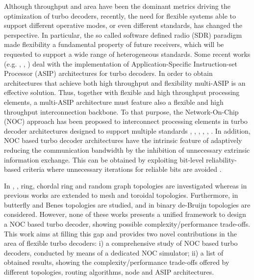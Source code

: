 \documentclass[10pt,twocolumn,journal]{IEEEtran}
\begin{document}
Although throughput and area have been the dominant metrics driving the optimization of turbo decoders,
recently, the need for flexible systems able to support different operative 
modes, or even different standards, has changed the perspective. In particular, the so called software defined radio 
(SDR) paradigm made flexibility a fundamental property \cite{polydoros_PIMRC08} of future receivers, which will be 
requested to support a wide range of heterogeneous standards.
Some recent works  
(e.g.  \cite{wehn_TVLSI08}, \cite{bougard_ICT08}, \cite{baghdadi_TVLSI09}) deal with 
the implementation of Application-Specific Instruction-set 
Processor (ASIP) architectures for turbo decoders. In order to obtain architectures that achieve both high throughput 
and flexibility multi-ASIP is an effective solution. Thus, together with flexible and 
high throughput processing elements, a multi-ASIP architecture must feature also a flexible and high throughput 
interconnection backbone. To that purpose, 
the Network-On-Chip (NOC) approach has been 
proposed to interconnect processing elements in turbo decoder architectures 
designed to support multiple standards 
\cite{wehn_icecs02}, \cite{wehn_icassp03}, \cite{speziali_EUROMICRO04},
\cite{wehn_iscas05}, \cite{moussa_date07}, \cite{moussa_iscas08}. 
In addition, NOC based turbo decoder architectures have the intrinsic feature of adaptively reducing the 
communication bandwidth by the inhibition of unnecessary extrinsic information exchange. 
This can be obtained by exploiting bit-level reliability-based criteria where unnecessary iterations for reliable bits are 
avoided \cite{baghdadi_EL06}.

In \cite{wehn_icecs02}, \cite{wehn_icassp03}, \cite{speziali_EUROMICRO04} ring, chordal ring and random 
graph topologies are investigated whereas in \cite{wehn_iscas05} previous works are extended to mesh and 
toroidal topologies. Furthermore, in \cite{moussa_date07} butterfly and Benes topologies are studied, 
and in \cite{moussa_iscas08} binary de-Bruijn topologies are considered. 
However, none of these works presents a unified framework to design 
a NOC based turbo decoder, showing possible complexity/performance trade-offs.
This work aims at filling this gap and provides two novel contributions in the area of flexible turbo decoders: 
i) a comprehensive study of NOC based turbo decoders, conducted by means of a dedicated NOC simulator; ii) a list 
of obtained results, showing the complexity/performance trade-offs offered by different topologies, routing algorithms, 
node and ASIP architectures.
\end{document}
